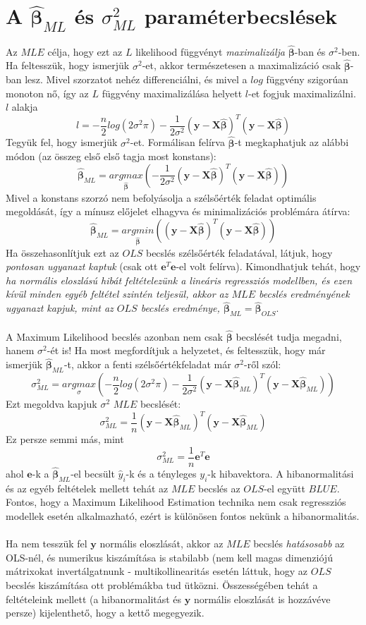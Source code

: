 \documentclass[14p]{report}
\def\pmb{\boldsymbol}
\def\ebeta{\hat{\pmb{\beta}}}
\newcounter{x}
\newcounter{y}
\newcounter{z}
\begin{document}
	\section{A $\ebeta_{ML}$ és $\sigma^2_{ML}$ paraméterbecslések}
	Az $MLE$ célja, hogy ezt az $L$ likelihood függvényt \emph{maximalizálja} $\ebeta$-ban és $\sigma^2$-ben. Ha feltesszük, hogy ismerjük $\sigma^2$-et, akkor természetesen a maximalizáció csak $\ebeta$-ban lesz. Mivel szorzatot nehéz differenciálni, és mivel a $log$ függvény szigorúan monoton nő, így az $L$ függvény maximalizálása helyett $l$-et fogjuk maximalizálni. $l$ alakja
	\[
		l = -\frac{n}{2}log(2\sigma^2\pi) - \frac{1}{2\sigma^2}(\pmb{y} - \pmb{X}\ebeta)^T(\pmb{y} - \pmb{X}\ebeta)
	\]
	Tegyük fel, hogy ismerjük $\sigma^2$-et. Formálisan felírva $\ebeta$-t megkaphatjuk az alábbi módon (az összeg első első tagja most konstans):
	\[
		\ebeta_{ML} = \underset{\ebeta}{argmax}\left(
			-\frac{1}{2\sigma^2}(\pmb{y} - \pmb{X}\ebeta)^T(\pmb{y} - \pmb{X}\ebeta)
		\right)
	\]
	Mivel a konstans szorzó nem befolyásolja a szélsőérték feladat optimális megoldását, így a mínusz előjelet elhagyva és minimalizációs problémára átírva:
	\[
		\ebeta_{ML} = \underset{\ebeta}{argmin}\left(
			(\pmb{y} - \pmb{X}\ebeta)^T(\pmb{y} - \pmb{X}\ebeta)
		\right)
	\]
	Ha összehasonlítjuk ezt az $OLS$ becslés szélsőérték feladatával, látjuk, hogy \emph{pontosan ugyanazt kaptuk} (csak ott $\pmb{e}^T\pmb{e}$-el volt felírva). Kimondhatjuk tehát, hogy \emph{ha normális eloszlású hibát feltételezünk a lineáris regressziós modellben, és ezen kívül minden egyéb feltétel szintén teljesül, akkor az $MLE$ becslés eredményének ugyanazt kapjuk, mint az $OLS$ becslés eredménye, $\ebeta_{ML} = \ebeta_{OLS}$}.
	\\
	\\
	A Maximum Likelihood becslés azonban nem csak $\ebeta$ becslését tudja megadni, hanem $\sigma^2$-ét is! Ha most megfordítjuk a helyzetet, és feltesszük, hogy már ismerjük $\ebeta_{ML}$-t, akkor a fenti szélsőértékfeladat már $\sigma^2$-ről szól:
	\[
		\sigma^2_{ML} = \underset{\sigma}{argmax}\left(
		-\frac{n}{2}log(2\sigma^2\pi) - \frac{1}{2\sigma^2}(\pmb{y} - \pmb{X}\ebeta_{ML})^T(\pmb{y} - \pmb{X}\ebeta_{ML})
		\right)
	\]
	Ezt megoldva kapjuk $\sigma^2$ $MLE$ becslését:
	\[
		\sigma^2_{ML} = \frac{1}{n}(\pmb{y} - \pmb{X}\ebeta_{ML})^T(\pmb{y} - \pmb{X}\ebeta_{ML})
	\]
	Ez persze semmi más, mint
	\[
		\sigma^2_{ML} = \frac{1}{n}\pmb{e}^T\pmb{e}
	\]
	ahol $\pmb{e}$-k a $\ebeta_{ML}$-el becsült $\hat{y}_i$-k és a tényleges $y_i$-k hibavektora. A hibanormalitási és az egyéb feltételek mellett tehát az $MLE$ becslés az $OLS$-el együtt $BLUE$. Fontos, hogy a Maximum Likelihood Estimation technika nem csak regressziós modellek esetén alkalmazható, ezért is különösen fontos nekünk a hibanormalitás. 
	\\
	\\
	Ha nem tesszük fel $\pmb{y}$ normális eloszlását, akkor az $MLE$ becslés  \emph{hatásosabb} az OLS-nél, és numerikus kiszámítása is stabilabb (nem kell magas dimenziójú mátrixokat invertálgatnunk - multikollinearitás esetén láttuk, hogy az $OLS$ becslés kiszámítása ott problémákba tud ütközni. Összességében tehát a feltételeink mellett (a hibanormalitást és $\pmb{y}$ normális eloszlását is hozzávéve persze) kijelenthető, hogy a kettő megegyezik.
	
\end{document}
